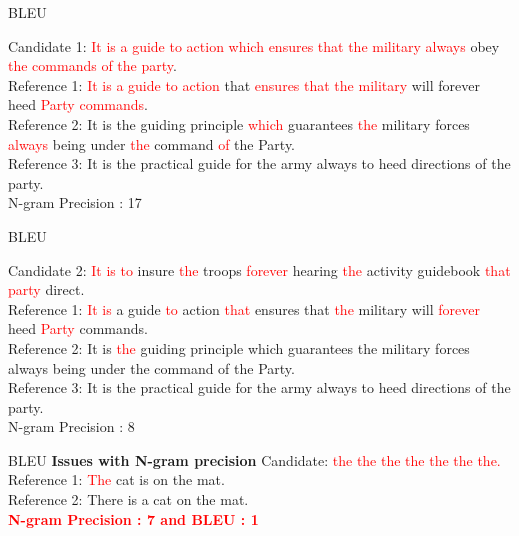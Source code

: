 ﻿\documentclass[table,aspectratio=43,mathserif,xcolor={usenames,dvipsnames,svgnames,table},10pt]{beamer}
\begin{document}
\begin{frame}{BLEU}

Candidate 1: \textcolor{red} {It is a guide to action which ensures that the military always} obey  \textcolor{red} {the commands of the party}.
\\
Reference 1: \textcolor{red} {It is a guide to action} that \textcolor{red} {ensures that the military} will forever heed \textcolor{red} {Party commands}. 
\\
Reference 2: It is the guiding principle \textcolor{red} {which} guarantees \textcolor{red} {the} military forces \textcolor{red} {always} being under \textcolor{red} {the} command \textcolor{red} {of} the Party.
\\
Reference 3: It is the practical guide for the army always to heed directions of the party.
\\
N-gram Precision : 17
\end{frame}

\begin{frame}{BLEU}

Candidate 2: \textcolor{red} {It is to} insure \textcolor{red} {the} troops \textcolor{red} {forever} hearing \textcolor{red} {the} activity guidebook \textcolor{red} {that party} direct. 
\\
Reference 1: \textcolor{red} {It is} a guide \textcolor{red} {to} action \textcolor{red} {that} ensures that \textcolor{red} {the} military will \textcolor{red} {forever} heed \textcolor{red} {Party} commands. 
\\
Reference 2: It is \textcolor{red} {the} guiding principle which guarantees the military forces always being under the command of the Party.
\\
Reference 3: It is the practical guide for the army always to heed directions of the party.
\\
N-gram Precision : 8
\end{frame}

\begin{frame}{BLEU}
\textbf{Issues with N-gram precision}
Candidate: \textcolor{red} {the the the the the the the.} \\
Reference 1: \textcolor{red} {The} cat is on the mat. \\
Reference 2: There is a cat on the mat.\\

\textbf{ \textcolor{red}{N-gram Precision : 7 and BLEU : 1}}
\end{frame}
\end{document}
